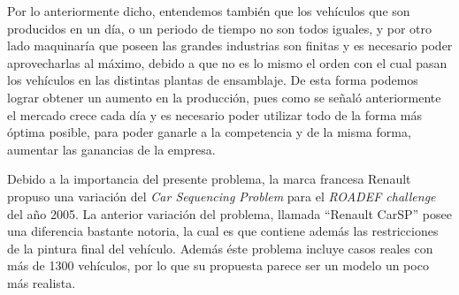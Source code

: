 Por lo anteriormente dicho, entendemos también que los vehículos que son producidos en un día,
o un periodo de tiempo no son todos iguales, y por otro lado maquinaría que poseen las grandes industrias son
finitas y es necesario poder aprovecharlas al máximo, debido a que no es lo mismo el orden con el cual pasan
los vehículos en las distintas plantas de ensamblaje.
De esta forma podemos lograr obtener un aumento en la producción, pues como
se señaló anteriormente el mercado crece cada día y es necesario poder utilizar todo de la forma
más óptima posible, para poder ganarle a la competencia y de la misma forma, aumentar las ganancias
de la empresa.

Debido a la importancia del presente problema, la marca francesa Renault propuso una variación del \emph{Car Sequencing Problem}
para el \emph{ROADEF challenge} del año 2005. La anterior variación del problema, llamada ``Renault CarSP'' posee una
diferencia bastante notoria, la cual es que contiene además las restricciones de la pintura final del vehículo.
Además éste problema incluye casos reales con más de 1300 vehículos, por lo que su propuesta parece ser un modelo un poco
más realista.
